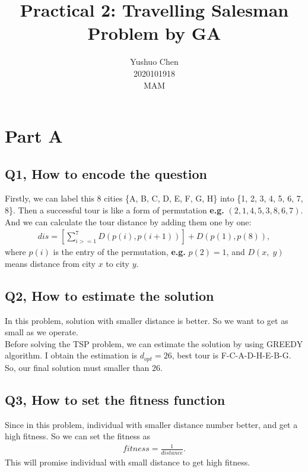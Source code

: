 \documentclass{article}
\begin{document}
\title{\textbf{Practical 2: Travelling Salesman Problem by GA}}
\author{Yushuo Chen\\2020101918\\MAM}
\maketitle

\section*{Part A}
\subsection*{Q1, How to encode the question}
Firstly, we can label this 8 cities \{A, B, C, D, E, F, G, H\} into \{1, 2, 3, 4, 5, 6, 7, 8\}.
Then a successful tour is like a form of permutation \textbf{e.g.} $(2,1,4,5,3,8,6,7)$.
And we can calculate the tour distance by adding them one by one:
\begin{align*}
  dis=[\sum_{i>=1}^{7} D(p(i),p(i+1))]+D(p(1),p(8)),
\end{align*}
where $p(i)$ is the entry of the permutation, \textbf{e.g.} $p(2)=1$, and $D(x,\; y)$ means distance from city $x$ to city $y$.

\subsection*{Q2, How to estimate the solution}
In this problem, solution with smaller distance is better.
So we want to get as small as we operate.\\
Before solving the TSP problem, we can estimate the solution by using GREEDY algorithm.
I obtain the estimation is $d_{opt}=26$, best tour is F-C-A-D-H-E-B-G.
So, our final solution must smaller than 26.

\subsection*{Q3, How to set the fitness function}
Since in this problem, individual with smaller distance number better, and get a high fitness.
So we can set the fitness as 
\begin{align*}
  fitness=\frac{1}{distance}.
\end{align*}
This will promise individual with small distance to get high fitness.
\end{document}
